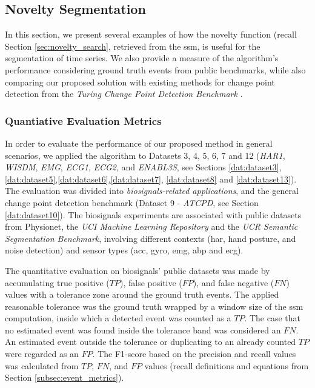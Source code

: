 \subsection{Novelty Segmentation}

In this section, we present several examples of how the novelty function (recall Section \ref{sec:novelty_search}, retrieved from the \gls{ssm}, is useful for the segmentation of time series. We also provide a measure of the algorithm's performance considering ground truth events from public benchmarks, while also comparing our proposed solution with existing methods for change point detection from the \textit{Turing Change Point Detection Benchmark} \cite{cpd_alan}.

\subsubsection{Quantiative Evaluation Metrics}

In order to evaluate the performance of our proposed method in general scenarios, we applied the algorithm to Datasets 3, 4, 5, 6, 7 and 12 (\textit{HAR1}, \textit{WISDM}, \textit{EMG}, \textit{ECG1}, \textit{ECG2}, and \textit{ENABL3S}, see Sections \ref{dat:dataset3}, \ref{dat:dataset5},\ref{dat:dataset6},\ref{dat:dataset7}, \ref{dat:dataset8} and \ref{dat:dataset13}). The evaluation was divided into \textit{biosignals-related applications}, and the general change point detection benchmark (Dataset 9 - \textit{ATCPD}, see Section \ref{dat:dataset10}). The biosignals experiments are associated with public datasets from Physionet, the \textit{UCI Machine Learning Repository} and the \textit{UCR Semantic Segmentation Benchmark}, involving different contexts (\gls{har}, hand posture, and noise detection) and sensor types (\gls{acc}, \gls{gyro}, \gls{emg}, \gls{abp} and \gls{ecg}).

The quantitative evaluation on biosignals' public datasets was made by accumulating true positive ($TP$), false positive ($FP$), and false negative ($FN$) values with a tolerance zone around the ground truth events. The applied reasonable tolerance was the ground truth wrapped by a window size of the \gls{ssm} computation, inside which a detected event was counted as a $TP$. The case that no estimated event was found inside the tolerance band was considered an $FN$. An estimated event outside the tolerance or duplicating to an already counted $TP$ were regarded as an $FP$. The F1-score based on the precision and recall values was calculated from $TP$, $FN$, and $FP$ values (recall definitions and equations from Section \ref{subsec:event_metrics}).

